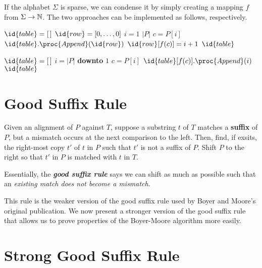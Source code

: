 If the alphabet $\Sigma$ is sparse, we can condense it by simply creating a mapping $f$ from $\Sigma \to \mathbb{N}$. The two approaches can be implemented as follows, respectively.

\begin{multicols}{2}
    \begin{codebox}
        \li $\id{table} = [\,]$
        \li $\id{row} = [0,\ldots,0]$
        \li \For $i = 1$ \To $|P|$ \Do
            \li $c = P[i]$
            \li $\id{table}.\proc{Append}(\id{row})$
            \li $\id{row}[f(c)] = i + 1$
        \End
        \li \Return $\id{table}$ 
    \end{codebox}
    
    \begin{codebox}
        \li $\id{table} = [\,]$
        \li \For $i = |P|$ \textbf{downto} $1$ \Do
            \li $c = P[i]$
            \li $\id{table}[f(c)].\proc{Append}(i)$
        \End
        \li \Return $\id{table}$ 
    \end{codebox}
    
\end{multicols}


\section{Good Suffix Rule}

\begin{rules} 
    \normalfont
    Given an alignment of $P$ against $T$, suppose a substring $t$ of $T$ matches a \textbf{suffix} of $P$, but a mismatch occurs at the next comparison to the left. Then, find, if exsits, the right-most copy $t'$ of $t$ in $P$ such that $t'$ is not a suffix of $P$. Shift $P$ to the right so that $t'$ in $P$ is matched with $t$ in $T$.
\end{rules}

Essentially, the \textit{\textbf{good suffix rule}} says we can shift as much as possible such that an \textit{existing match does not become a mismatch}. 

This rule is the weaker version of the good suffix rule used by Boyer and Moore's original publication. We now present a stronger version of the good suffix rule that allows us to prove properties of the Boyer-Moore algorithm more easily.

\section{Strong Good Suffix Rule}

